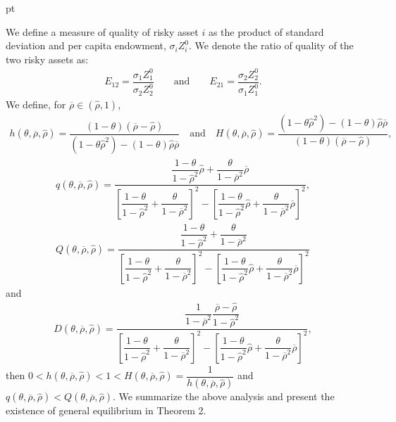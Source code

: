 \documentclass[10pt]{article}
\begin{document}
 pt

We define a measure of quality of risky asset $i$ as the product of standard deviation and per capita endowment, $ \sigma_i Z_i^0 $. We denote the ratio of quality of the two risky assets as:
\begin{eqnarray*}
E_{1 2} = \dfrac{\sigma_1 Z_1^0}{\sigma_2 Z_2^0} \qquad \text{and} \qquad E_{2 1} = \dfrac{\sigma_2 Z_2^0}{\sigma_1 Z_1^0}.
\end{eqnarray*}
We define, for $ \overline{\rho} \in ({\hat \rho}, 1) $,
\begin{eqnarray*}
h (\theta, \overline{\rho}, {\hat \rho}) = \dfrac{(1 - \theta) (\overline{\rho} - {\hat \rho})}{(1 - \theta {\hat \rho}^2) - (1 - \theta) {\hat \rho} \overline{\rho}} \quad \text{and} \quad H (\theta, \overline{\rho}, {\hat \rho}) = \dfrac{(1 - \theta {\hat \rho}^2) - (1 - \theta) {\hat \rho} \overline{\rho}}{(1 - \theta) (\overline{\rho} - {\hat \rho})},
\end{eqnarray*}
\begin{eqnarray*}
& q (\theta, \overline{\rho}, {\hat \rho}) = \dfrac{\dfrac{1 - \theta}{1 - {\hat \rho}^2} {\hat \rho} + \dfrac{\theta}{1 - \overline{\rho}^2} \overline{\rho}}{\left[ \dfrac{1 - \theta}{1 - {\hat \rho}^2} + \dfrac{\theta}{1 - \overline{\rho}^2} \right]^2 - \left[ \dfrac{1 - \theta}{1 - {\hat \rho}^2} {\hat \rho} + \dfrac{\theta}{1 - \overline{\rho}^2} \overline{\rho} \right]^2}, & \\
& Q (\theta, \overline{\rho}, {\hat \rho}) = \dfrac{\dfrac{1 - \theta}{1 - {\hat \rho}^2} + \dfrac{\theta}{1 - \overline{\rho}^2}}{\left[ \dfrac{1 - \theta}{1 - {\hat \rho}^2} + \dfrac{\theta}{1 - \overline{\rho}^2} \right]^2 - \left[ \dfrac{1 - \theta}{1 - {\hat \rho}^2} {\hat \rho} + \dfrac{\theta}{1 - \overline{\rho}^2} \overline{\rho} \right]^2} &
\end{eqnarray*}
and
\begin{eqnarray*}
D (\theta, \overline{\rho}, {\hat \rho}) = \dfrac{\dfrac{1}{1 - \overline{\rho}^2} \dfrac{\overline{\rho} - {\hat \rho}}{1 - {\hat \rho}^2}}{\left[ \dfrac{1 - \theta}{1 - {\hat \rho}^2} + \dfrac{\theta}{1 - \overline{\rho}^2} \right]^2 - \left[ \dfrac{1 - \theta}{1 - {\hat \rho}^2} {\hat \rho} + \dfrac{\theta}{1 - \overline{\rho}^2} \overline{\rho} \right]^2},
\end{eqnarray*}
then $ 0 < h (\theta, \overline{\rho}, {\hat \rho}) < 1 < H (\theta, \overline{\rho}, {\hat \rho}) = \dfrac{1}{h (\theta, \overline{\rho}, {\hat \rho})} $ and $ q (\theta, \overline{\rho}, {\hat \rho}) < Q (\theta, \overline{\rho}, {\hat \rho}) $.
We summarize the above analysis and present the existence of general equilibrium in Theorem 2. 
\end{document}
